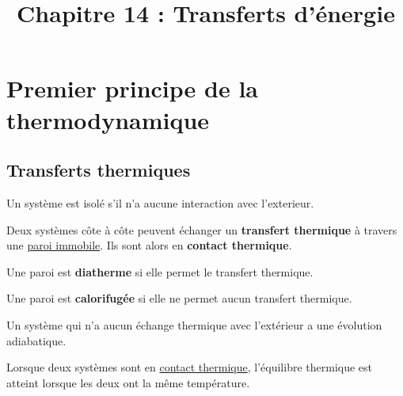 \documentclass[12pt]{article}
\title{Chapitre 14 : Transferts d'énergie}
\author{}
\date{}
\theoremstyle{cstyle}{\newtheorem{definition}{Définition}[section]}
\theoremstyle{cstyle}{\newtheorem{proposition}[definition]{Propriété}}
\theoremstyle{cstyle}{\newtheorem{theorem}[definition]{Théorème}}
\theoremstyle{mystyle}{\newtheorem{lemma}[definition]{Lemme}}
\theoremstyle{mystyle}{\newtheorem{corollary}[definition]{Corollaire}}
\theoremstyle{mystyle}{\newtheorem*{remark}{Remarque}}
\theoremstyle{mystyle}{\newtheorem*{remarks}{Remarques}}
\theoremstyle{mystyle}{\newtheorem*{example}{Exemple}}
\theoremstyle{mystyle}{\newtheorem*{examples}{Exemples}}
\theoremstyle{definition}{\newtheorem*{exercise}{Exercice}}
\theoremstyle{mystyle}{\newtheorem*{methode}{Méthode}}
\theoremstyle{cstyle}{\newtheorem*{cthm}{}}
\theoremstyle{warn}
\begin{document}
	
	\maketitle
	
	\begin{minipage}[t]{0.45\textwidth}
		\section{Premier principe de la thermodynamique}
		
		\subsection{Transferts thermiques}
		\begin{definition}
			Un système est isolé s'il n'a aucune interaction avec l'exterieur.
		\end{definition}
		\begin{definition}
			Deux systèmes côte à côte peuvent échanger un \textbf{transfert thermique} à travers une \underline{paroi immobile}. Ils sont alors en \textbf{contact thermique}.
		\end{definition}
	
		\begin{definition}
			Une paroi est \textbf{diatherme} si elle permet le transfert thermique.
			
			Une paroi est \textbf{calorifugée} si elle ne permet aucun transfert thermique.
		\end{definition}
	
		\begin{definition}
			Un système qui n'a aucun échange thermique avec l'extérieur a une évolution adiabatique.
		\end{definition}
	
		\begin{proposition}
			Lorsque deux systèmes sont en \underline{contact thermique}, l'équilibre thermique est atteint lorsque les deux ont la même température.
		\end{proposition}
	
	\end{minipage}
	\hfill
	\vrule
	\hfill
\end{document}
